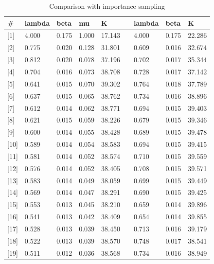 \documentclass[11pt]{beamer}
\begin{document}
\begin{frame}
\vspace{-1cm}
{\tiny
\begin{table}
\centering
\caption{Comparison with importance sampling}
\begin{tabular}{l|llll|l|lll}
\#       & lambda & beta  & mu    & K      &  & lambda & beta  & K      \\ \hline
{[}1{]}  & 4.000  & 0.175 & 1.000 & 17.143 &  & 4.000  & 0.175 & 22.286 \\
{[}2{]}  & 0.775  & 0.020 & 0.128 & 31.801 &  & 0.609  & 0.016 & 32.674 \\
{[}3{]}  & 0.812  & 0.020 & 0.078 & 37.196 &  & 0.702  & 0.017 & 35.344 \\
{[}4{]}  & 0.704  & 0.016 & 0.073 & 38.708 &  & 0.728  & 0.017 & 37.142 \\
{[}5{]}  & 0.641  & 0.015 & 0.070 & 39.302 &  & 0.764  & 0.018 & 37.789 \\
{[}6{]}  & 0.637  & 0.015 & 0.065 & 38.762 &  & 0.734  & 0.016 & 38.896 \\
{[}7{]}  & 0.612  & 0.014 & 0.062 & 38.771 &  & 0.694  & 0.015 & 39.403 \\
{[}8{]}  & 0.621  & 0.015 & 0.059 & 38.226 &  & 0.679  & 0.015 & 39.346 \\
{[}9{]}  & 0.600  & 0.014 & 0.055 & 38.428 &  & 0.689  & 0.015 & 39.478 \\
{[}10{]} & 0.589  & 0.014 & 0.054 & 38.583 &  & 0.694  & 0.015 & 39.415 \\
{[}11{]} & 0.581  & 0.014 & 0.052 & 38.574 &  & 0.710  & 0.015 & 39.559 \\
{[}12{]} & 0.576  & 0.014 & 0.052 & 38.405 &  & 0.708  & 0.015 & 39.571 \\
{[}13{]} & 0.583  & 0.014 & 0.049 & 38.059 &  & 0.699  & 0.015 & 39.449 \\
{[}14{]} & 0.569  & 0.014 & 0.047 & 38.291 &  & 0.690  & 0.015 & 39.425 \\
{[}15{]} & 0.553  & 0.013 & 0.045 & 38.210 &  & 0.659  & 0.014 & 39.896 \\
{[}16{]} & 0.541  & 0.013 & 0.042 & 38.409 &  & 0.654  & 0.014 & 39.855 \\
{[}17{]} & 0.528  & 0.013 & 0.039 & 38.450 &  & 0.713  & 0.016 & 39.179 \\
{[}18{]} & 0.522  & 0.013 & 0.039 & 38.570 &  & 0.748  & 0.017 & 38.541 \\
{[}19{]} & 0.511  & 0.012 & 0.036 & 38.568 &  & 0.734  & 0.016 & 38.949 \\

\end{tabular}
\end{table}}
\end{frame}
\end{document}
